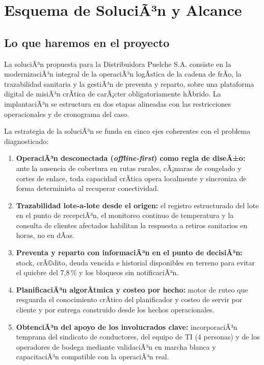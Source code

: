 ﻿%
\chapter{Esquema de SoluciÃ³n y Alcance}
\label{sec:solucion}

\section{Lo que haremos en el proyecto}

La soluciÃ³n propuesta para la Distribuidora Puelche S.A. consiste en la modernizaciÃ³n
integral de la operaciÃ³n logÃ­stica de la cadena de frÃ­o, la trazabilidad sanitaria y la
gestiÃ³n de preventa y reparto, sobre una plataforma digital de misiÃ³n crÃ­tica de
carÃ¡cter obligatoriamente hÃ­brido. La implantaciÃ³n se estructura en dos etapas alineadas
con las restricciones operacionales y de cronograma del caso.

La estrategia de la soluciÃ³n se funda en cinco ejes coherentes con el problema
diagnosticado:

\begin{enumerate}
  \item \textbf{OperaciÃ³n desconectada (\emph{offline-first}) como regla de diseÃ±o:}
        ante la ausencia de cobertura en rutas rurales, cÃ¡maras de congelado y cortes de
        enlace, toda capacidad crÃ­tica opera localmente y sincroniza de forma
        determinista al recuperar conectividad.
  \item \textbf{Trazabilidad lote-a-lote desde el origen:} el registro estructurado del
        lote en el punto de recepciÃ³n, el monitoreo continuo de temperatura y la
        consulta de clientes afectados habilitan la respuesta a retiros sanitarios en
        horas, no en dÃ­as.
  \item \textbf{Preventa y reparto con informaciÃ³n en el punto de decisiÃ³n:} stock,
        crÃ©dito, deuda vencida e historial disponibles en terreno para evitar el quiebre
        del 7,8\,\% y los bloqueos sin notificaciÃ³n.
  \item \textbf{PlanificaciÃ³n algorÃ­tmica y costeo por hecho:} motor de ruteo que
        resguarda el conocimiento crÃ­tico del planificador y costeo de servir por
        cliente y por entrega construido desde los hechos operacionales.
  \item \textbf{ObtenciÃ³n del apoyo de los involucrados clave:} incorporaciÃ³n temprana
        del sindicato de conductores, del equipo de TI (4 personas) y de los operadores
        de bodega mediante validaciÃ³n en marcha blanca y capacitaciÃ³n compatible con la
        operaciÃ³n real.
\end{enumerate}

